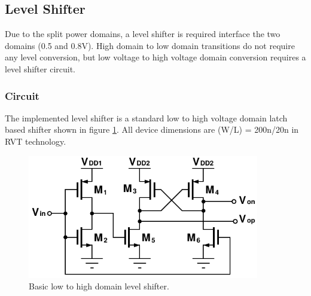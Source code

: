 	\FloatBarrier
	\subsection{Level Shifter}
	Due to the split power domains, a level shifter is required interface the two domains (0.5 and 0.8V). High domain to low domain transitions do not require any level conversion, but low voltage to high voltage domain conversion requires a level shifter circuit. 

		\subsubsection{Circuit}
			The implemented level shifter is a standard low to high voltage domain latch based shifter \cite{weste_harris_2011} shown in figure \ref{fig:level_shifter}. All device dimensions are (W/L) = 200n/20n in RVT technology.
			\begin{figure}[htb!]
			        \centering
			        \includegraphics[width=0.9\textwidth, angle=0]{./figs/design/level_shift}
			    \caption{Basic low to high domain level shifter.}
			    \label{fig:level_shifter}
			\end{figure}




	\FloatBarrier\pagebreak

